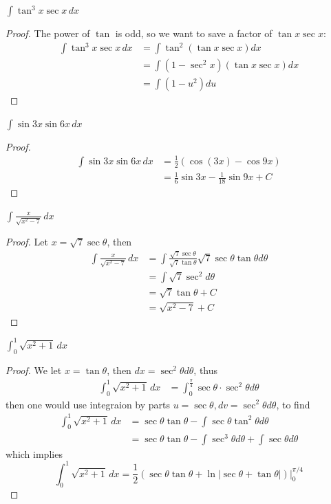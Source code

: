 \documentclass[openany]{book}
\begin{document}
\begin{prob}
    $\displaystyle \int \tan^3 x \sec x\,dx$
\end{prob}
\begin{proof}
    The power of $\tan$ is odd, so we want to save a factor of $\tan x\sec x$:
    \begin{align*}
        \int \tan^3 x \sec x\,dx&=\int \tan^2(\tan x\sec x)dx\\
        &=\int(1-\sec^2x)(\tan x\sec x)dx\\
        &=\int(1-u^2)du
    \end{align*}
\end{proof}




\begin{prob}
    $\displaystyle \int \sin 3x \sin 6x\,dx$
\end{prob}
\begin{proof}
    \begin{align*}
        \int \sin 3x \sin 6x\,dx&=\frac{1}{2}\left(\cos (3x)-\cos 9x\right)\\
        &=\frac{1}{6}\sin 3x-\frac{1}{18}\sin 9x+C
    \end{align*}
\end{proof}


\begin{prob}
    $\displaystyle \int \frac{x}{\sqrt{x^2-7}}\,dx$
\end{prob}
\begin{proof}
    Let $x=\sqrt{7}\sec \theta$, then 
    \begin{align*}
        \int \frac{x}{\sqrt{x^2-7}}\,dx&=\int\frac{\sqrt{7}\sec \theta}{\sqrt{7}\tan\theta}\sqrt{7}\sec\theta\tan\theta d\theta\\
        &=\int \sqrt{7}\sec^2d\theta\\
        &=\sqrt{7}\tan\theta+C\\
        &=\sqrt{x^2-7}+C
    \end{align*}
\end{proof}

\begin{prob}
    $\displaystyle \int_0^1 \sqrt{x^2+1}\,dx$
\end{prob}
\begin{proof}
    We let $x=\tan\theta$, then $dx=\sec^2\theta d\theta$, thus 
    \begin{align*}
        \int_0^1 \sqrt{x^2+1}\,dx&=\int_0^{\frac{\pi}{4}}\sec\theta\cdot\sec^2\theta d\theta
    \end{align*}
    then one would use integraion by parts $u=\sec\theta, dv=\sec^2\theta d\theta$, to find 
    \begin{align*}
        \int_0^1 \sqrt{x^2+1}\,dx&=\sec \theta\tan \theta-\int\sec\theta\tan^2\theta d\theta\\
        &=\sec \theta\tan \theta-\int\sec^3\theta d\theta+\int\sec\theta d\theta
    \end{align*}
    which implies 
    \begin{equation*}
        \int_0^1 \sqrt{x^2+1}\,dx=\frac{1}{2}\left(\sec\theta\tan\theta+\ln|\sec\theta+\tan\theta|\right)\bigg\vert_0^{\pi/4}
    \end{equation*}
\end{proof}
\end{document}
